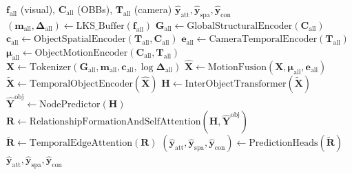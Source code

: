 \documentclass{article}
\newcommand{\mat}[1]{\bm{#1}}
\begin{document}
\begin{algorithm}[h]
\caption{W-DsgDetr++ Forward Pass}
\begin{algorithmic}[1]
\Require $\mat{f}_{\text{all}}$ (visual), $\mat{C}_{\text{all}}$ (OBBs), $\mat{T}_{\text{all}}$ (camera)
\Ensure $\hat{\mat{y}}_{\text{att}}, \hat{\mat{y}}_{\text{spa}}, \hat{\mat{y}}_{\text{con}}$
\State $(\mat{m}_{\text{all}}, \bm{\Delta}_{\text{all}}) \gets \text{LKS\_Buffer}(\mat{f}_{\text{all}})$
\State $\mat{G}_{\text{all}} \gets \text{GlobalStructuralEncoder}(\mat{C}_{\text{all}})$
\State $\mat{c}_{\text{all}} \gets \text{ObjectSpatialEncoder}(\mat{T}_{\text{all}}, \mat{C}_{\text{all}})$
\State $\mat{e}_{\text{all}} \gets \text{CameraTemporalEncoder}(\mat{T}_{\text{all}})$
\State $\mat{\mu}_{\text{all}} \gets \text{ObjectMotionEncoder}(\mat{C}_{\text{all}}, \mat{T}_{\text{all}})$
\State $\mat{X} \gets \text{Tokenizer}(\mat{G}_{\text{all}}, \mat{m}_{\text{all}}, \mat{c}_{\text{all}}, \log \bm{\Delta}_{\text{all}})$
\State $\hat{\mat{X}} \gets \text{MotionFusion}(\mat{X}, \mat{\mu}_{\text{all}}, \mat{e}_{\text{all}})$
\State $\tilde{\mat{X}} \gets \text{TemporalObjectEncoder}(\hat{\mat{X}})$
\State $\mat{H} \gets \text{InterObjectTransformer}(\tilde{\mat{X}})$
\State $\hat{\mat{Y}}^{\text{obj}} \gets \text{NodePredictor}(\mat{H})$
\State $\mat{R} \gets \text{RelationshipFormationAndSelfAttention}(\mat{H}, \hat{\mat{Y}}^{\text{obj}})$
\State $\tilde{\mat{R}} \gets \text{TemporalEdgeAttention}(\mat{R})$
\State $(\hat{\mat{y}}_{\text{att}}, \hat{\mat{y}}_{\text{spa}}, \hat{\mat{y}}_{\text{con}}) \gets \text{PredictionHeads}(\tilde{\mat{R}})$
\State \Return $\hat{\mat{y}}_{\text{att}}, \hat{\mat{y}}_{\text{spa}}, \hat{\mat{y}}_{\text{con}}$
\end{algorithmic}
\end{algorithm}
\end{document}
